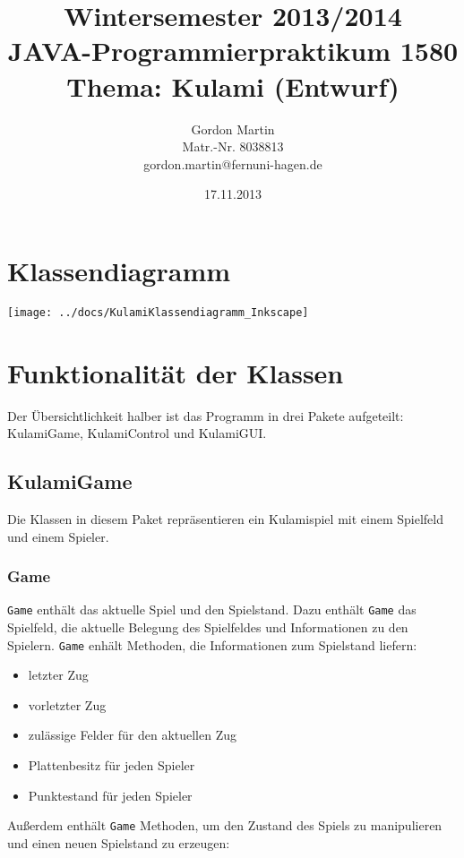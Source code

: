 \documentclass{scrartcl}
\title{Wintersemester 2013/2014 \\
  JAVA-Programmierpraktikum 1580 \\
  Thema: Kulami (Entwurf)
}
\author{Gordon Martin\\
  Matr.-Nr. 8038813 \\
  gordon.martin@fernuni-hagen.de
}
\date{17.11.2013}
\begin{document}
 
\maketitle
\thispagestyle{empty}

\setcounter{page}{1}


\section{Klassendiagramm}
\label{sec:Klassendiagramm}

\texttt{[image: ../docs/KulamiKlassendiagramm\_Inkscape]}

\section{Funktionalität der Klassen}
\label{sec:Funktionalitaet}

Der Übersichtlichkeit halber ist das Programm in drei Pakete aufgeteilt: KulamiGame, KulamiControl und KulamiGUI.

\subsection{KulamiGame}
\label{sec:Spielklassen}

Die Klassen in diesem Paket repräsentieren ein Kulamispiel mit einem Spielfeld und einem Spieler.


\subsubsection{Game}
\label{sec:Game}

\texttt{Game} enthält das aktuelle Spiel und den Spielstand. Dazu enthält \texttt{Game} das Spielfeld, die aktuelle Belegung des Spielfeldes und Informationen zu den Spielern.  \texttt{Game} enhält Methoden, die Informationen zum Spielstand liefern:

\begin{itemize}
\item letzter Zug
\item vorletzter Zug
\item zulässige Felder für den aktuellen Zug
\item Plattenbesitz für jeden Spieler
\item Punktestand für jeden Spieler
\end{itemize}

Außerdem enthält \texttt{Game} Methoden, um den Zustand des Spiels zu manipulieren und einen neuen Spielstand zu erzeugen:
\end{document}
